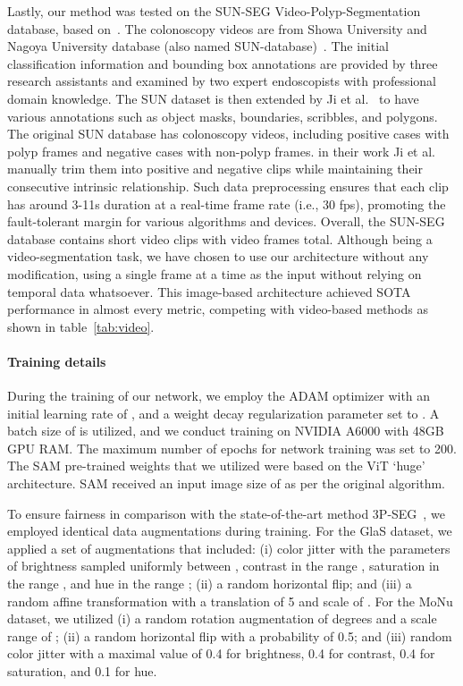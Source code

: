 \documentclass[runningheads]{llncs}
\begin{document}
Lastly, our method was tested on the SUN-SEG Video-Polyp-Segmentation database, based on~\cite{misawa2020development,ji2022video}. The colonoscopy videos are from Showa University and Nagoya University database (also named SUN-database)~\cite{misawa2020development}.
The initial classification information and bounding box annotations are provided by three research assistants and examined by two expert endoscopists with professional domain knowledge. The SUN dataset is then extended by Ji et al.~\cite{ji2022video} to have various annotations such as object masks, boundaries, scribbles, and polygons.
The original SUN database has  colonoscopy videos, including  positive cases with  polyp frames and  negative cases with  non-polyp frames.
in their work Ji et al.~\cite{ji2022video} manually trim them into  positive and  negative clips while maintaining their consecutive intrinsic relationship.
Such data preprocessing ensures that each clip has around 3-11s duration at a real-time frame rate (i.e., 30 fps), promoting the fault-tolerant margin for various algorithms and devices.
Overall, the SUN-SEG database contains  short video clips with  video frames total.
Although being a video-segmentation task, we have chosen to use our architecture without any modification, using a single frame at a time as the input without relying on temporal data whatsoever. This image-based architecture achieved SOTA performance in almost every metric, competing with video-based methods as shown in table~\ref{tab:video}.


\paragraph{Training details} During the training of our network, we employ the ADAM optimizer with an initial learning rate of , and a weight decay regularization parameter set to . A batch size of  is utilized, and we conduct training on NVIDIA A6000 with 48GB GPU RAM. The maximum number of epochs for network training was set to 200. The SAM pre-trained weights that we utilized were based on the ViT `huge' architecture. SAM received an input image size of  as per the original algorithm.

To ensure fairness in comparison with the state-of-the-art method 3P-SEG~\cite{shaharabany2022end}, we employed identical data augmentations during training. For the GlaS dataset, we applied a set of augmentations that included: (i) color jitter with the parameters of brightness sampled uniformly between , contrast in the range , saturation in the range , and hue in the range ; (ii) a random horizontal flip; and (iii) a random affine transformation with a translation of 5 and scale of . For the MoNu dataset, we utilized (i) a random rotation augmentation of  degrees and a scale range of ; (ii) a random horizontal flip with a probability of 0.5; and (iii) random color jitter with a maximal value of 0.4 for brightness, 0.4 for contrast, 0.4 for saturation, and 0.1 for hue.
\end{document}
